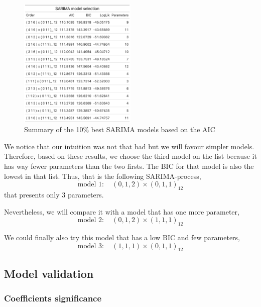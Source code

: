 \begin{figure}[H]
	\centering
	\includegraphics[width=0.5\textwidth]{figures/box_jenkins/sarima_model_selection.png}
	\caption{Summary of the 10\% best SARIMA models based on the AIC}
	\label{fig:sarima-model-selection}
\end{figure}

We notice that our intuition was not that bad but we will favour simpler models. Therefore, based on these results, we choose the third model on the list because it has way fewer parameters than the two firsts. The BIC for that model is also the lowest in that list. Thus, that is the following SARIMA-process,
\begin{equation}
	\text{model 1}: \quad (0, 1, 2) \times (0, 1, 1)_{12}
\end{equation}
that presents only $3$ parameters.

Nevertheless, we will compare it with a model that has one more parameter,
\begin{equation}
	\text{model 2}: \quad (0, 1, 2) \times (1, 1, 1)_{12}
\end{equation}

We could finally also try this model that has a low BIC and few parameters, 
\begin{equation}
	\text{model 3}: \quad (1, 1, 1) \times (0, 1, 1)_{12}
\end{equation}

\subsection{Model validation}

\subsubsection{Coefficients significance}


